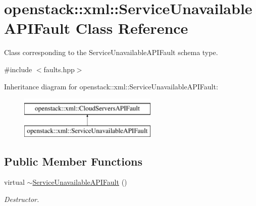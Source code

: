 \hypertarget{classopenstack_1_1xml_1_1ServiceUnavailableAPIFault}{
\section{openstack::xml::ServiceUnavailableAPIFault Class Reference}
\label{classopenstack_1_1xml_1_1ServiceUnavailableAPIFault}
}


Class corresponding to the ServiceUnavailableAPIFault schema type.  




{\ttfamily \#include $<$faults.hpp$>$}

Inheritance diagram for openstack::xml::ServiceUnavailableAPIFault:\begin{figure}[H]
\begin{center}
\leavevmode
\includegraphics[height=2.000000cm]{classopenstack_1_1xml_1_1ServiceUnavailableAPIFault}
\end{center}
\end{figure}
\subsection*{Public Member Functions}
\begin{DoxyCompactItemize}
\item 
\hypertarget{classopenstack_1_1xml_1_1ServiceUnavailableAPIFault_a05a3c4671d52c838c78d58605ea10654}{
virtual \hyperlink{classopenstack_1_1xml_1_1ServiceUnavailableAPIFault_a05a3c4671d52c838c78d58605ea10654}{$\sim$ServiceUnavailableAPIFault} ()}
\label{classopenstack_1_1xml_1_1ServiceUnavailableAPIFault_a05a3c4671d52c838c78d58605ea10654}

\begin{DoxyCompactList}\small\item\em Destructor. \item\end{DoxyCompactList}\end{DoxyCompactItemize}
